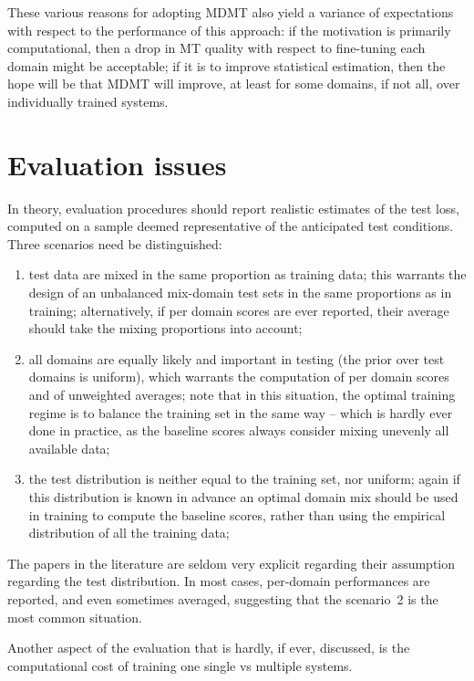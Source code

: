 \documentclass[11pt]{article}
\begin{document}
These various reasons for adopting MDMT also yield a variance of expectations with respect to the performance of this approach: if the motivation is primarily computational, then a drop in MT quality with respect to fine-tuning each domain might be acceptable; if it is to improve statistical estimation, then the hope will be that MDMT will improve, at least for some domains, if not all, over individually trained systems.

\section{Evaluation issues \label{sec:evaluation}}

In theory, evaluation procedures should report realistic estimates of the test loss, computed on a sample deemed representative of the anticipated test conditions. Three scenarios need be distinguished:
\begin{enumerate}
\item test data are mixed in the same proportion as training data; this warrants the design of an unbalanced mix-domain test sets in the same proportions as in training; alternatively, if per domain scores are ever reported, their average should take the mixing proportions into account;
\item all domains are equally likely and important in testing (the prior over test domains is uniform), which warrants the computation of per domain scores and of unweighted averages; note that in this situation, the optimal training regime is to balance the training set in the same way -- which is hardly ever done in practice, as the baseline scores always consider mixing unevenly all available data;
\item the test distribution is neither equal to the training set, nor uniform; again if this distribution is known in advance an optimal domain mix should be used in training to compute the baseline scores, rather than using the empirical distribution of all the training data;
\end{enumerate}
The papers in the literature are seldom very explicit regarding their assumption regarding the test distribution. In most cases, per-domain performances are reported, and even sometimes averaged, suggesting that the scenario~2 is the most common situation. 

Another aspect of the evaluation that is hardly, if ever, discussed, is the computational cost of training one single vs multiple systems.
\end{document}
